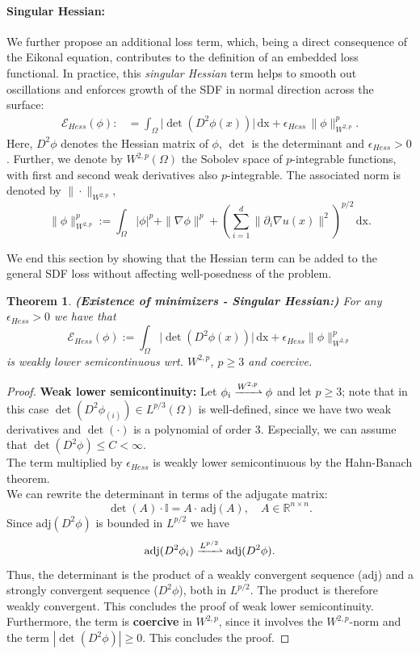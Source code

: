 \documentclass[draft,12pt,openany]{book}
\newcommand{\R}{\mathbb{R}}
\theoremstyle{plainnormal}
\newtheorem{theorem}{Theorem}[section]
\theoremstyle{remark}
\begin{document}
\paragraph{Singular Hessian:}
We further propose an additional loss term, which, being a direct consequence of the Eikonal equation, contributes to the definition of an embedded loss functional. In practice, this \emph{singular Hessian} term helps to smooth out oscillations and enforces growth of the SDF in normal direction across the surface: 
\begin{align}\label{loss_Hess}
    \mathcal{E}_{Hess}({\phi}) :&=   \int_\Omega \big|\det(D^2 \phi(x))\big| \,\mathrm{dx} + \epsilon_{Hess}\, \|\phi\|_{W^{2,p}}^p  .
\end{align}
Here, $D^2 \phi$ denotes the Hessian matrix of $\phi$, $\det$ is the determinant and $\epsilon_{Hess} > 0$. Further, we denote by \( W^{2,p}(\Omega) \) the Sobolev space of $p$-integrable functions, with first and second weak derivatives also \( p \)-integrable. The associated norm is denoted by \( \|\cdot\|_{W^{2,p}} \), $$\|\phi\|^p_{W^{2,p}} :=\int_\Omega |\phi|^p + \|\nabla \phi\|^p + \left( \sum_{i=1}^d \| \partial_i \nabla u(x) \|^2 \right)^{p/2} \, \mathrm{dx}.$$

We end this section by showing that the Hessian term can be added to the general SDF loss without affecting well-posedness of the problem.
\begin{theorem}{\textbf{(Existence of minimizers - Singular Hessian:)}}
For any $\epsilon_{Hess} > 0$ we have that $$ \mathcal E_{Hess}(\phi) := \int_\Omega \big|\det(D^2 \phi(x))\big| \,\mathrm{dx} + \epsilon_{Hess} \|\phi\|_{W^{2,p}}^p $$
is weakly lower semicontinuous wrt. $W^{2,p}$, $p\geq 3$ and coercive.
\end{theorem} 
\begin{proof}
    \textbf{Weak lower semicontinuity:} Let $\phi_i \xrightharpoonup{W^{2,p}} \phi$ and let $p \geq 3$; note that in this case $\det(D^2\phi_{(i)}) \in L^{p/3}(\Omega)$ is well-defined, since we have two weak derivatives and $\det(\cdot)$ is a polynomial of order 3. Especially, we can assume that $\det(D^2\phi) \leq C < \infty$. \\ 
    The term multiplied by $\epsilon_{Hess}$ is weakly lower semicontinuous by the Hahn-Banach theorem.\\
    We can rewrite the determinant in terms of the adjugate matrix:
    $$\det(A) \cdot \mathbb I = A\cdot \,\mathrm{adj}(A), \quad A\in\R^{n\times n}.$$
    Since $\mathrm{adj}(D^2\phi)$ is bounded in $L^{p/2}$ we have  $$\mathrm{adj}(D^2 \phi_i) \xrightharpoonup{L^{p/2}}\mathrm{adj}(D^2 \phi). $$
    Thus, the determinant is the product of a weakly convergent sequence ($\mathrm{adj}$) and a strongly convergent sequence ($D^2\phi$), both in $L^{p/2}$. The product is therefore weakly convergent. This concludes the proof of weak lower semicontinuity. \\
    Furthermore, the term is \textbf{coercive} in $W^{2,p}$, since it involves the $W^{2,p}$-norm and the term $|\det(D^2\phi)|\geq 0$. This concludes the proof.
    
\end{proof}
\end{document}
